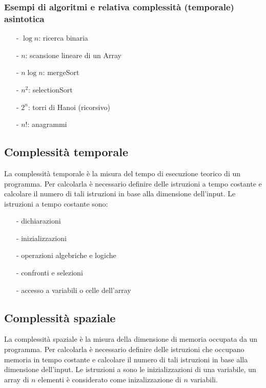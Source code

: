 \documentclass{article}
\begin{document}
\subsubsection*{Esempi di algoritmi e relativa complessità (temporale) asintotica}
\begin{itemize} [topsep=3pt, itemsep=0pt]
	\item[-] \(\log n\): ricerca binaria
	\item[-] \(n\): scansione lineare di un Array
	\item[-] \(n \log n\): mergeSort
	\item[-] \(n^2\): selectionSort
	\item[-] \(2^n\): torri di Hanoi (ricorsivo)
	\item[-] \(n!\): anagrammi
\end{itemize}

\subsection{Complessità temporale}
La complessità temporale è la misura del tempo di esecuzione teorico di un programma. Per calcolarla è necessario definire delle
istruzioni a tempo costante e calcolare il numero di tali istruzioni in base alla dimensione dell'input.
Le istruzioni a tempo costante sono:
\begin{itemize} [topsep=3pt, itemsep=0pt]
	\item[-] dichiarazioni
	\item[-] inizializzazioni
	\item[-] operazioni algebriche e logiche
	\item[-] confronti e selezioni
	\item[-] accesso a variabili o celle dell'array
\end{itemize}

\subsection{Complessità spaziale}
La complessità spaziale è la misura della dimensione di memoria occupata da un programma. Per calcolarla è necessario definire
delle istruzioni che occupano memoria in tempo costante e calcolare il numero di tali istruzioni in base alla dimensione dell'input.
Le istruzioni a  sono le inizializzazioni di una variabile, un array di \(n\) elementi è considerato come
inizalizzazione di \(n\) variabili.

\newpage
\end{document}
